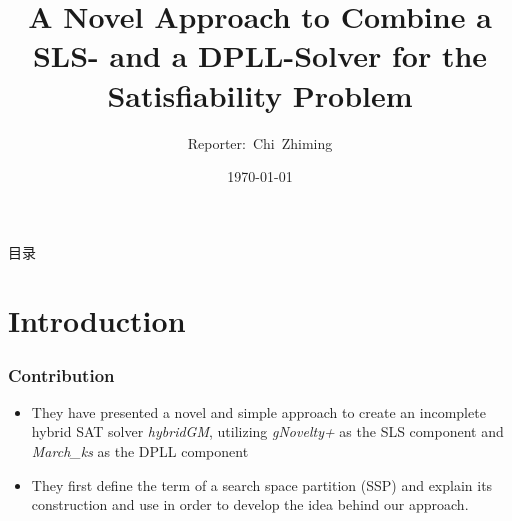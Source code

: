 \documentclass[aspectratio=169%
,serif,mathserif]{beamer}
\begin{document}
\title{A Novel Approach to Combine a SLS- and a DPLL-Solver for the Satisfiability Problem} %
\author[Chi~Zhiming]{Reporter:~Chi~Zhiming} %
\institute[ISCAS] %
{	
}
	\CTEXoptions[today=old]
	\date{\today} %
\begin{frame}[plain]\vspace{1.5em}
\titlepage\vspace{-0.5cm}
\end{frame}
\begin{frame}{目录}
\tableofcontents
\end{frame}

\section{Introduction} %
\begin{frame}
	\frametitle{Contribution}
	\begin{itemize}
		\item They have presented a novel and simple approach to create an incomplete hybrid SAT solver \emph{hybridGM}, utilizing \emph{gNovelty+} as the SLS component and \emph{March\_ks} as the DPLL component 
		\item They first define the term of a search space partition (SSP) and explain its construction and use in order to develop the idea behind our approach.
	\end{itemize}

\end{frame}
\end{document}
